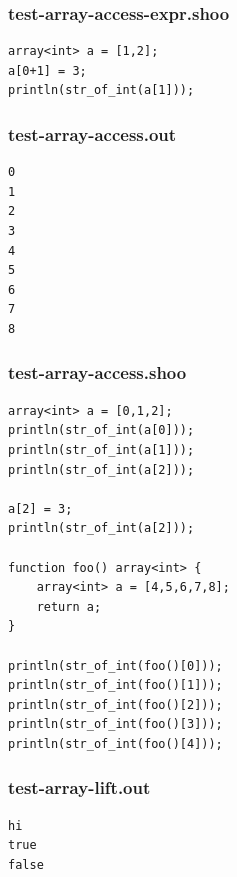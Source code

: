 \documentclass[12pt]{article}
\begin{document}
\subsubsection{test-array-access-expr.shoo}
\begin{mdframed}[hidealllines=true,backgroundcolor=blue!10]
\begin{lstlisting}
array<int> a = [1,2];
a[0+1] = 3;
println(str_of_int(a[1]));
\end{lstlisting}
\end{mdframed}
\subsubsection{test-array-access.out}
\begin{mdframed}[hidealllines=true,backgroundcolor=green!10]
\begin{lstlisting}
0
1
2
3
4
5
6
7
8
\end{lstlisting}
\end{mdframed}
\subsubsection{test-array-access.shoo}
\begin{mdframed}[hidealllines=true,backgroundcolor=blue!10]
\begin{lstlisting}
array<int> a = [0,1,2];
println(str_of_int(a[0]));
println(str_of_int(a[1]));
println(str_of_int(a[2]));

a[2] = 3;
println(str_of_int(a[2]));

function foo() array<int> {
    array<int> a = [4,5,6,7,8];
    return a;
}

println(str_of_int(foo()[0]));
println(str_of_int(foo()[1]));
println(str_of_int(foo()[2]));
println(str_of_int(foo()[3]));
println(str_of_int(foo()[4]));
\end{lstlisting}
\end{mdframed}
\subsubsection{test-array-lift.out}
\begin{mdframed}[hidealllines=true,backgroundcolor=green!10]
\begin{lstlisting}
hi
true
false
\end{lstlisting}
\end{mdframed}
\end{document}
